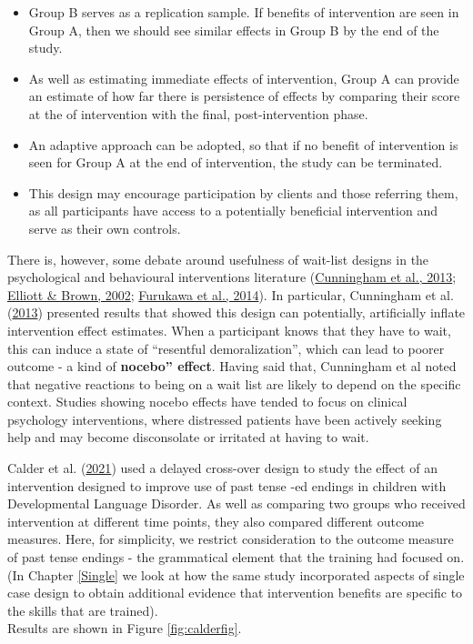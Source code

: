 \documentclass{krantz}
\providecommand{\tightlist}{%
\setlength{\itemsep}{0pt}\setlength{\parskip}{0pt}}
\begin{document}
\begin{itemize}
\tightlist
\item
  Group B serves as a replication sample. If benefits of intervention are seen in Group A, then we should see similar effects in Group B by the end of the study.\\
\item
  As well as estimating immediate effects of intervention, Group A can provide an estimate of how far there is persistence of effects by comparing their score at the of intervention with the final, post-intervention phase.\\
\item
  An adaptive approach can be adopted, so that if no benefit of intervention is seen for Group A at the end of intervention, the study can be terminated.\\
\item
  This design may encourage participation by clients and those referring them, as all participants have access to a potentially beneficial intervention and serve as their own controls.
\end{itemize}

There is, however, some debate around usefulness of wait-list designs in the psychological and behavioural interventions literature (\protect\hyperlink{ref-cunningham2013}{Cunningham et al., 2013}; \protect\hyperlink{ref-elliott2002}{Elliott \& Brown, 2002}; \protect\hyperlink{ref-furukawa2014}{Furukawa et al., 2014}). In particular, Cunningham et al. (\protect\hyperlink{ref-cunningham2013}{2013}) presented results that showed this design can potentially, artificially inflate intervention effect estimates. When a participant knows that they have to wait, this can induce a state of ``resentful demoralization'', which can lead to poorer outcome - a kind of \textbf{nocebo'' effect}. Having said that, Cunningham et al noted that negative reactions to being on a wait list are likely to depend on the specific context. Studies showing nocebo effects have tended to focus on clinical psychology interventions, where distressed patients have been actively seeking help and may become disconsolate or irritated at having to wait.

Calder et al. (\protect\hyperlink{ref-calder2021}{2021}) used a delayed cross-over design to study the effect of an intervention designed to improve use of past tense -ed endings in children with Developmental Language Disorder. As well as comparing two groups who received intervention at different time points, they also compared different outcome measures. Here, for simplicity, we restrict consideration to the outcome measure of past tense endings - the grammatical element that the training had focused on. (In Chapter \ref{Single} we look at how the same study incorporated aspects of single case design to obtain additional evidence that intervention benefits are specific to the skills that are trained).\\
Results are shown in Figure \ref{fig:calderfig}.
\end{document}
